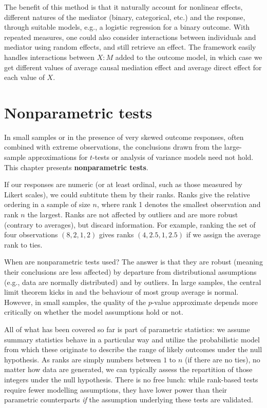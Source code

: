 \documentclass[
  11pt,
  letterpaper,
]{scrbook}
\theoremstyle{definition}
\theoremstyle{definition}
\theoremstyle{remark}
\begin{document}
The benefit of this method is that it naturally account for nonlinear
effects, different natures of the mediator (binary, categorical, etc.)
and the response, through suitable models, e.g., a logistic regression
for a binary outcome. With repeated measures, one could also consider
interactions between individuals and mediator using random effects, and
still retrieve an effect. The framework easily handles interactions
between \(X:M\) added to the outcome model, in which case we get
different values of average causal mediation effect and average direct
effect for each value of \(X\).


\chapter{Nonparametric tests}\label{nonparametric-tests}

In small samples or in the presence of very skewed outcome responses,
often combined with extreme observations, the conclusions drawn from the
large-sample approximations for \(t\)-tests or analysis of variance
models need not hold. This chapter presents \textbf{nonparametric
tests}.

If our responses are numeric (or at least ordinal, such as those
measured by Likert scales), we could subtitute them by their ranks.
Ranks give the relative ordering in a sample of size \(n\), where rank 1
denotes the smallest observation and rank \(n\) the largest. Ranks are
not affected by outliers and are more robust (contrary to averages), but
discard information. For example, ranking the set of four observations
\((8, 2, 1, 2)\) gives ranks \((4, 2.5, 1, 2.5)\) if we assign the
average rank to ties.

When are nonparametric tests used? The answer is that they are robust
(meaning their conclusions are less affected) by departure from
distributional assumptions (e.g., data are normally distributed) and by
outliers. In large samples, the central limit theorem kicks in and the
behaviour of most group average is normal. However, in small samples,
the quality of the \(p\)-value approximate depends more critically on
whether the model assumptions hold or not.

All of what has been covered so far is part of parametric statistics: we
assume summary statistics behave in a particular way and utilize the
probabilistic model from which these originate to describe the range of
likely outcomes under the null hypothesis. As ranks are simply numbers
between \(1\) to \(n\) (if there are no ties), no matter how data are
generated, we can typically assess the repartition of those integers
under the null hypothesis. There is no free lunch: while rank-based
tests require fewer modelling assumptions, they have lower power than
their parametric counterparts \emph{if} the assumption underlying these
tests are validated.
\end{document}
